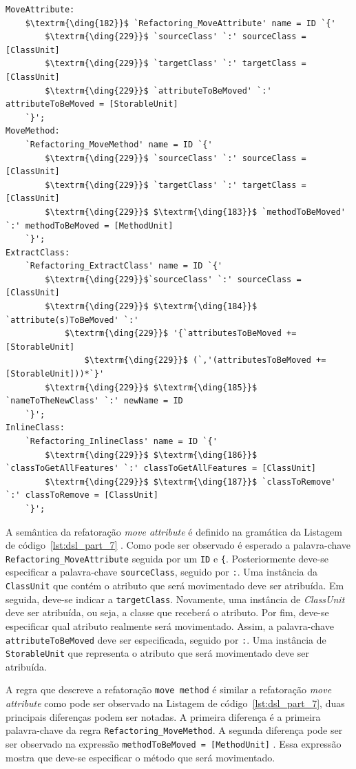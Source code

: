 \begin{lstlisting}[language=Xtext, frame=single, basicstyle=\scriptsize, mathescape=true, label={lst:dsl_part_7}, caption={Gramática da DSL - parte 7}]
MoveAttribute: 
	$\textrm{\ding{182}}$ `Refactoring_MoveAttribute' name = ID `{'
		$\textrm{\ding{229}}$ `sourceClass' `:' sourceClass = [ClassUnit]
		$\textrm{\ding{229}}$ `targetClass' `:' targetClass = [ClassUnit]
		$\textrm{\ding{229}}$ `attributeToBeMoved' `:' attributeToBeMoved = [StorableUnit]
	`}';
MoveMethod:
	`Refactoring_MoveMethod' name = ID `{'
		$\textrm{\ding{229}}$ `sourceClass' `:' sourceClass = [ClassUnit]
		$\textrm{\ding{229}}$ `targetClass' `:' targetClass = [ClassUnit]
		$\textrm{\ding{229}}$ $\textrm{\ding{183}}$ `methodToBeMoved' `:' methodToBeMoved = [MethodUnit]
	`}';
ExtractClass: 
	`Refactoring_ExtractClass' name = ID `{'
		$\textrm{\ding{229}}$`sourceClass' `:' sourceClass = [ClassUnit]
		$\textrm{\ding{229}}$ $\textrm{\ding{184}}$ `attribute(s)ToBeMoved' `:' 
			$\textrm{\ding{229}}$ '{`attributesToBeMoved += [StorableUnit] 
				$\textrm{\ding{229}}$ (`,'(attributesToBeMoved += [StorableUnit]))*`}'
		$\textrm{\ding{229}}$ $\textrm{\ding{185}}$ `nameToTheNewClass' `:' newName = ID
	`}';
InlineClass: 
	`Refactoring_InlineClass' name = ID `{'
		$\textrm{\ding{229}}$ $\textrm{\ding{186}}$ `classToGetAllFeatures' `:' classToGetAllFeatures = [ClassUnit]
		$\textrm{\ding{229}}$ $\textrm{\ding{187}}$ `classToRemove' `:' classToRemove = [ClassUnit]
	`}';
\end{lstlisting}

A semântica da refatoração \textit{move attribute} é definido na gramática da Listagem de código~\ref{lst:dsl_part_7} . Como pode ser observado é esperado a palavra-chave \texttt{Refactoring\_MoveAttribute} seguida por um \texttt{ID} e \texttt{\{}. Posteriormente deve-se especificar a palavra-chave \texttt{sourceClass}, seguido por \texttt{:}. Uma instância da \texttt{ClassUnit} que contém o atributo que será movimentado deve ser atribuída. Em seguida, deve-se indicar a \texttt{targetClass}. Novamente, uma instância de \textit{ClassUnit} deve ser atribuída, ou seja, a classe que receberá o atributo. Por fim, deve-se especificar qual atributo realmente será movimentado. Assim, a palavra-chave \texttt{attributeToBeMoved} deve ser especificada, seguido por \texttt{:}. Uma instância de \texttt{StorableUnit} que representa o atributo que será movimentado deve ser atribuída.

A regra que descreve a refatoração \texttt{move method} é similar a refatoração \textit{move attribute} como pode ser observado na Listagem de código~\ref{lst:dsl_part_7}, duas principais diferenças podem ser notadas. A primeira diferença é a primeira palavra-chave da regra \texttt{Refactoring\_MoveMethod}. A segunda diferença pode ser ser observado na expressão \texttt{methodToBeMoved = [MethodUnit]} . Essa expressão mostra que deve-se especificar o método que será movimentado.

